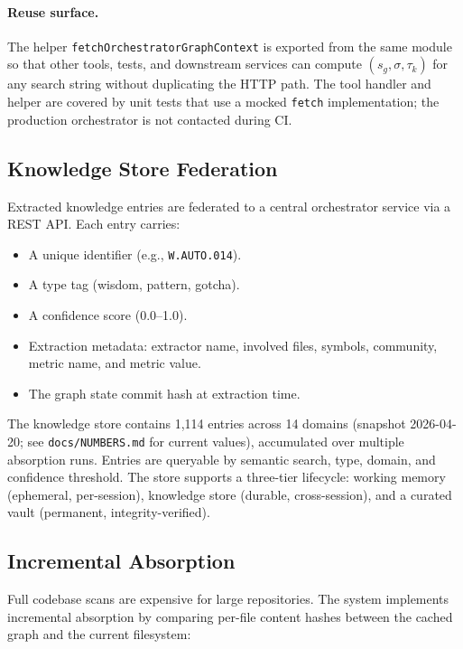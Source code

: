 \documentclass[conference]{IEEEtran}
\begin{document}
\paragraph{Reuse surface.} The helper
\texttt{fetchOrchestratorGraphContext} is exported from the same module
so that other tools, tests, and downstream services can compute
$(s_g, \sigma, \tau_k)$ for any search string without duplicating the
HTTP path. The tool handler and helper are covered by unit tests that
use a mocked \texttt{fetch} implementation; the production orchestrator
is not contacted during CI.

\subsection{Knowledge Store Federation}
\label{sec:impl:knowledge}

Extracted knowledge entries are federated to a central orchestrator
service via a REST API. Each entry carries:

\begin{itemize}
  \item A unique identifier (e.g., \texttt{W.AUTO.014}).
  \item A type tag (wisdom, pattern, gotcha).
  \item A confidence score (0.0--1.0).
  \item Extraction metadata: extractor name, involved files, symbols,
    community, metric name, and metric value.
  \item The graph state commit hash at extraction time.
\end{itemize}

The knowledge store contains 1,114 entries across 14 domains (snapshot 2026-04-20; see \texttt{docs/NUMBERS.md} for current values),
accumulated over multiple absorption runs. Entries are queryable by
semantic search, type, domain, and confidence threshold. The store
supports a three-tier lifecycle: working memory (ephemeral, per-session),
knowledge store (durable, cross-session), and a curated vault (permanent,
integrity-verified).

\subsection{Incremental Absorption}
\label{sec:impl:incremental}

Full codebase scans are expensive for large repositories. The system
implements incremental absorption by comparing per-file content hashes
between the cached graph and the current filesystem:
\end{document}
